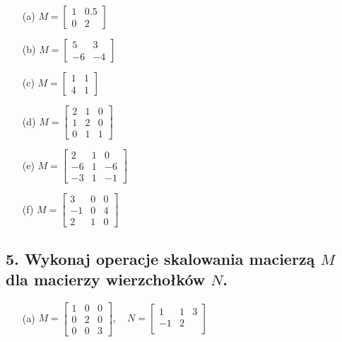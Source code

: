 \begin{enumerate}
    \item[(a)] \( M = \begin{bmatrix} 1 & 0.5 \\ 0 & 2 \end{bmatrix} \)
    
    \item[(b)] \( M = \begin{bmatrix} 5 & 3 \\ -6 & -4 \end{bmatrix} \)
    
    \item[(c)] \( M = \begin{bmatrix} 1 & 1 \\ 4 & 1 \end{bmatrix} \)
    
    \item[(d)] \( M = \begin{bmatrix} 2 & 1 & 0 \\ 1 & 2 & 0 \\ 0 & 1 & 1 \end{bmatrix} \)
    
    \item[(e)] \( M = \begin{bmatrix} 2 & 1 & 0 \\ -6 & 1 & -6 \\ -3 & 1 & -1 \end{bmatrix} \)
    
    \item[(f)] \( M = \begin{bmatrix} 3 & 0 & 0 \\ -1 & 0 & 4 \\ 2 & 1 & 0 \end{bmatrix} \)
\end{enumerate}

\subsection*{5. Wykonaj operacje skalowania macierzą \( M \) dla macierzy wierzchołków \( N \).}

\begin{enumerate}
    \item[(a)] \( M = \begin{bmatrix} 1 & 0 & 0 \\ 0 & 2 & 0 \\ 0 & 0 & 3 \end{bmatrix}, \quad
    N = \begin{bmatrix} 1 & 1 & 3 \\ -1 & 2 \\ \end{bmatrix} \)
\end{enumerate}


